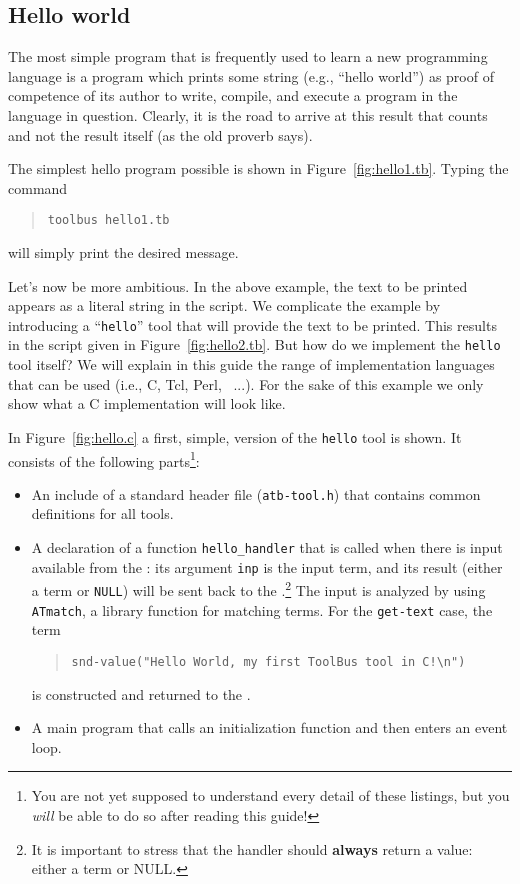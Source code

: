 \documentclass[twoside]{article} %
\begin{document}
\subsection{\label{Hello}Hello world}
The most simple program that is frequently used to learn a new
programming language is a program which prints some string (e.g.,
``hello world'') as proof of competence of its author to write,
compile, and execute a program in the language in question.  Clearly,
it is the road to arrive at this result that counts and not the result
itself (as the old proverb says).

The simplest hello program possible is shown in Figure~\ref{fig:hello1.tb}.
Typing the command
\begin{quote}
{\tt toolbus hello1.tb}
\end{quote}
will simply print the desired message.



Let's now be more ambitious. In the above example, the text to be printed
appears as a literal string in the script. We complicate the example
by introducing a ``{\tt hello}'' tool that will provide the text to be printed.
This results in the script given in Figure~\ref{fig:hello2.tb}.
But how do we implement the {\tt hello} tool itself?
We will explain in this guide the range of implementation languages that 
can be used (i.e., C, Tcl, Perl, \ASFSDF\ ...).
For the sake of this example we only show what a C implementation will look like.

In Figure~\ref{fig:hello.c} a first, simple, version of the {\tt hello} tool
is shown. It consists of the following parts\footnote{
You are not yet supposed to understand every detail of these
listings, but you {\em will} be able to do so after reading this guide!}:
\begin{itemize}
\item An include of a standard header file ({\tt atb-tool.h}) that contains
common definitions for all tools.
\item A declaration of a function {\tt hello\_handler} that is called when there is
input available from the \TB:
its argument {\tt inp} is the input term, and its result (either a term
or {\tt NULL}) will be sent back to the \TB.\footnote{It is important
to stress that the handler should {\bf always} return a value: 
either a term or NULL.}
The input is analyzed by using {\tt ATmatch}, a library function for matching
terms. For the {\tt get-text} case, 
the term
\begin{quote}
\verb+snd-value("Hello World, my first ToolBus tool in C!\n")+
\end{quote}
is constructed and returned to the \TB.

\item A main program that calls an initialization function and
then enters an event loop.

\end{itemize}
\end{document}
